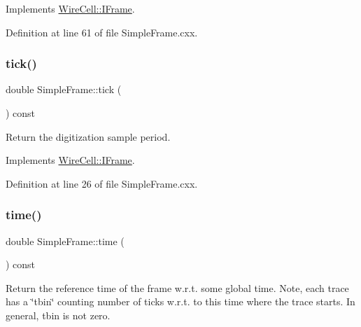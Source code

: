 Implements \hyperlink{class_wire_cell_1_1_i_frame_ae5d922a082d23583c7b6dff24c1116ed}{Wire\+Cell\+::\+I\+Frame}.



Definition at line 61 of file Simple\+Frame.\+cxx.

\mbox{\label{class_wire_cell_1_1_simple_frame_a14d84465625254f1b0086cef1d0bb5cd}} 
\subsubsection{\texorpdfstring{tick()}{tick()}}
{\footnotesize\ttfamily double Simple\+Frame\+::tick (\begin{DoxyParamCaption}{ }\end{DoxyParamCaption}) const\hspace{0.3cm}{\ttfamily [virtual]}}



Return the digitization sample period. 



Implements \hyperlink{class_wire_cell_1_1_i_frame_a5003631e8cb3f013c6ab84f26e09b852}{Wire\+Cell\+::\+I\+Frame}.



Definition at line 26 of file Simple\+Frame.\+cxx.

\mbox{\label{class_wire_cell_1_1_simple_frame_a992d807e8f20c9481deb419496b9de91}} 
\subsubsection{\texorpdfstring{time()}{time()}}
{\footnotesize\ttfamily double Simple\+Frame\+::time (\begin{DoxyParamCaption}{ }\end{DoxyParamCaption}) const\hspace{0.3cm}{\ttfamily [virtual]}}

Return the reference time of the frame w.\+r.\+t. some global time. Note, each trace has a \char`\"{}tbin\char`\"{} counting number of ticks w.\+r.\+t. to this time where the trace starts. In general, tbin is not zero. 

